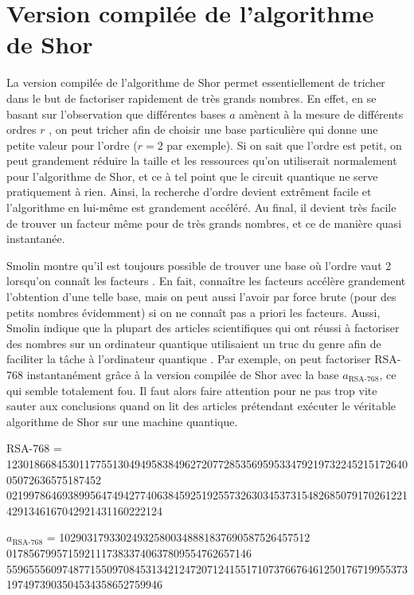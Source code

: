 \renewcommand{\theequation}{A.\arabic{equation}}
\setcounter{equation}{0}
\section{Version compilée de l'algorithme de Shor}
La version compilée de l'algorithme de Shor permet essentiellement de tricher dans le but de factoriser rapidement de très grands nombres. En effet, en se basant sur l'observation que différentes bases $a$ amènent à la mesure de différents ordres $r$ \cite{Smolin_2013}, on peut tricher afin de choisir une base particulière qui donne une petite valeur pour l'ordre ($r=2$ par exemple). Si on sait que l'ordre est petit, on peut grandement réduire la taille et les ressources qu'on utiliserait normalement pour l'algorithme de Shor, et ce à tel point que le circuit quantique ne serve pratiquement à rien. Ainsi, la recherche d'ordre devient extrêment facile et l'algorithme en lui-même est grandement accéléré. Au final, il devient très facile de trouver un facteur même pour de très grands nombres, et ce de manière quasi instantanée. 

Smolin montre qu'il est toujours possible de trouver une base où l'ordre vaut 2 lorsqu'on connaît les facteurs \cite{Smolin_2013}. En fait, connaître les facteurs accélère grandement l'obtention d'une telle base, mais on peut aussi l'avoir par force brute (pour des petits nombres évidemment) si on ne connaît pas a priori les facteurs. Aussi, Smolin indique que la plupart des articles scientifiques qui ont réussi à factoriser des nombres sur un ordinateur quantique utilisaient un truc du genre afin de faciliter la tâche à l'ordinateur quantique \cite{Smolin_2013}. Par exemple, on peut factoriser RSA-768 instantanément grâce à la version compilée de Shor avec la base $a_{\text{RSA-768}}$, ce qui semble totalement fou. Il faut alors faire attention pour ne pas trop vite sauter aux conclusions quand on lit des articles prétendant exécuter le véritable algorithme de Shor sur une machine quantique.

RSA-768 = 12301866845301177551304949583849627207728535695953347921973224521517264005072636575187452
0219978646938995647494277406384592519255732630345373154826850791702612214291346167042921431160222124

$a_{\text{RSA-768}}$ = 102903179330249325800348881837690587526457512
01785679957159211173833740637809554762657146
5596555609748771550970845313421247207124155171073766764612501767199553731974973903504534358652759946
